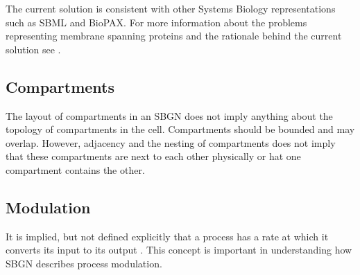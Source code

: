 The current solution is consistent with other Systems Biology
representations such as SBML and BioPAX. For more information about the
problems representing membrane spanning proteins and the rationale
behind the current solution see .

\subsection{Compartments}

The layout of compartments in an SBGN \PDm does not imply anything
about the topology of compartments in the cell. Compartments should be
bounded and may overlap. However, adjacency and the nesting of
compartments does not imply that these compartments are next to each
other physically or hat one compartment contains the other.

\subsection{Modulation}

It is implied, but not defined explicitly that a process has a rate at
which it converts its input  to its output . This concept is
important in understanding how SBGN describes process modulation.

